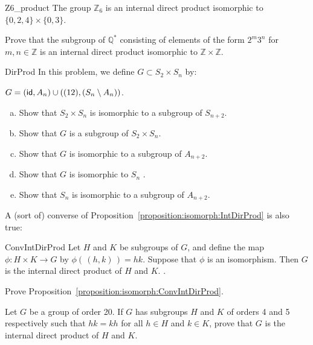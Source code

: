  
\begin{example}{Z6_product}
The group ${\mathbb Z}_6$ is an internal direct product isomorphic to $\{
0, 2, 4\} \times \{ 0, 3 \}$. 
\end{example}

\begin{exercise}{}
Prove that the subgroup of ${\mathbb Q}^\ast$ consisting of elements of
the form $2^m 3^n$ for $m,n \in {\mathbb Z}$ is an internal direct
product isomorphic to ${\mathbb Z} \times {\mathbb Z}$.
 \end{exercise}

\begin{exercise}{DirProd}
In this problem, we define  $G \subset S_2  \times S_n$ by:
\noindent

$G = ({\sf{i}d} , A_n) \cup ( (12) , (S_n \setminus  A_n))$.
\begin{enumerate}[(a)]
\item
Show that $S_2  \times S_n $ is isomorphic to a subgroup of $S_{n+2}$.  
\item
 Show that $G$  is  a subgroup of $S_2  \times S_n $.
\item
Show that $G$ is isomorphic to a subgroup of $A_{n+2}$.
\item
Show that $G$ is isomorphic to $S_n$ .
\item
Show that $S_n$ is isomorphic to a subgroup of $A_{n+2}$.  
\end{enumerate}
\end{exercise}

A (sort of) converse of Proposition~\ref{proposition:isomorph:IntDirProd} is also true:

\begin{prop}{ConvIntDirProd}
Let $H$ and $K$ be subgroups of $G$, and define the map $\phi:H \times K \rightarrow G$  by $\phi(\, (h,k)\,) = hk$.  Suppose that $\phi$ is an isomorphism.  Then $G$ is the internal direct product of  $H$ and $K$.
.\end{prop}

\begin{exercise}{}
Prove Proposition~\ref{proposition:isomorph:ConvIntDirProd}.
\end{exercise}

\begin{exercise}{}
Let $G$ be a group of order 20. If $G$ has subgroups $H$ and $K$ of
orders 4 and 5 respectively such that $hk = kh$ for all $h \in H$ and
$k \in K$, prove that $G$ is the internal direct product of $H$ and $K$. 
 \end{exercise}

